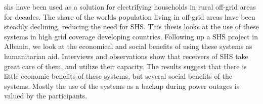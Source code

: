 
\abstract

\acrfull{shs} have been used as a solution for electrifying households in rural off-grid areas for decades. The share of the worlds population living in off-grid areas have been steadily declining, reducing the need for SHS. This thesis looks at the use of these systems in high grid coverage developing countries. Following up a SHS project in Albania, we look at the economical and social benefits of using these systems as humanitarian aid. Interviews and observations show that receivers of SHS take great care of them, and utilize their capacity. The results suggest that there is little economic benefits of these systems, but several social benefits of the systems. Mostly the use of the systems as a backup during power outages is valued by the participants.